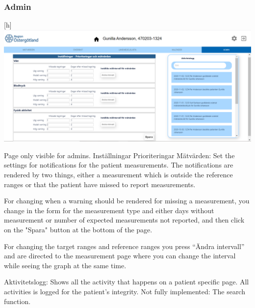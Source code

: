 \subsubsection{Admin}
\begin{center}[h]
    \includegraphics[width=\linewidth]{images/single_patient_admin_image.png}
    \label{fig:figures}
\end{center}
Page only visible for admins. 
Inställningar Prioriteringar Mätvärden:
Set the settings for notifications for the patient measurements. The notifications are rendered by two things, either a measurement which is outside the reference ranges or that the patient have missed to report measurements. 

For changing when a warning should be rendered for missing a measurement, you change in the form for the measurement type and either days without measurement or number of expected measurements not reported, and then click on the "Spara" button at the bottom of the page. 

For changing the target ranges and reference ranges you press “Ändra intervall” and are directed to the measurement page where you can change the interval while seeing the graph at the same time. 

Aktivitetslogg: 
Shows all the activity that happens on a patient specific page. All activities is logged for the patient's integrity.
Not fully implemented: 
The search function. 

\\
